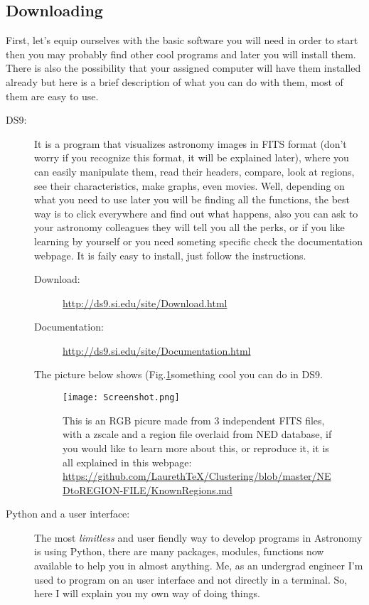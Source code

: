 \documentclass[11pt,fleqn]{book} %
\begin{document}
\subsection{Downloading}
First, let's equip ourselves with the basic software you will need in order to start then you may probably find other cool programs and later you will install them. There is also the possibility that your assigned computer will have them installed already but here is a brief description of what you can do with them, most of them are easy to use.

\begin{description}
	\item[DS9:] It is a program that visualizes astronomy images in FITS format (don't worry if you recognize this format, it will be explained later), where you can easily manipulate them, read their headers, compare, look at regions, see their characteristics, make graphs, even movies. Well, depending on what you need to use later you will be finding all the functions, the best way is to click everywhere and find out what happens, also you can ask to your astronomy colleagues they will tell you all the perks, or if you like learning by yourself or you need someting specific check the documentation webpage. It is faily easy to install, just follow the instructions.
    	\begin{description}
        	\item[Download: ]\url{http://ds9.si.edu/site/Download.html}
            \item[Documentation: ]\url{http://ds9.si.edu/site/Documentation.html}
        \end{description}
        The picture below shows (Fig.\ref{fig:screen}something cool you can do in DS9.
        \begin{figure}[h]
        	\centering
    \texttt{[image: Screenshot.png]}
    \caption{This is an RGB picure made from 3 independent FITS files, with a zscale and a region file overlaid from NED database, if you would like to learn more about this, or reproduce it, it is all explained in this webpage: \url{https://github.com/LaurethTeX/Clustering/blob/master/NEDtoREGION-FILE/KnownRegions.md}}
    \label{fig:screen}
        \end{figure}
        
    \item[Python and a user interface: ]The most \emph{limitless} and user fiendly way to develop programs in Astronomy is using Python, there are many packages, modules, functions now available to help you in almost anything. Me, as an undergrad engineer I'm used to program on an user interface and not directly in a terminal. So, here I will explain you my own way of doing things.
    

\end{description}
\end{document}
